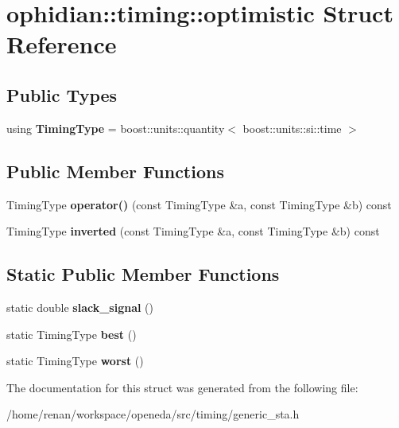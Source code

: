 \hypertarget{structophidian_1_1timing_1_1optimistic}{\section{ophidian\-:\-:timing\-:\-:optimistic Struct Reference}
\label{structophidian_1_1timing_1_1optimistic}
}
\subsection*{Public Types}
\begin{DoxyCompactItemize}
\item 
\hypertarget{structophidian_1_1timing_1_1optimistic_a20224456e3a1328f37724e5ad7d66f9c}{using {\bfseries Timing\-Type} = boost\-::units\-::quantity$<$ boost\-::units\-::si\-::time $>$}\label{structophidian_1_1timing_1_1optimistic_a20224456e3a1328f37724e5ad7d66f9c}

\end{DoxyCompactItemize}
\subsection*{Public Member Functions}
\begin{DoxyCompactItemize}
\item 
\hypertarget{structophidian_1_1timing_1_1optimistic_a37f4857a427814d852f1bfaa0261bafd}{Timing\-Type {\bfseries operator()} (const Timing\-Type \&a, const Timing\-Type \&b) const }\label{structophidian_1_1timing_1_1optimistic_a37f4857a427814d852f1bfaa0261bafd}

\item 
\hypertarget{structophidian_1_1timing_1_1optimistic_a70eaf65bacaa16ead50473c945afc56d}{Timing\-Type {\bfseries inverted} (const Timing\-Type \&a, const Timing\-Type \&b) const }\label{structophidian_1_1timing_1_1optimistic_a70eaf65bacaa16ead50473c945afc56d}

\end{DoxyCompactItemize}
\subsection*{Static Public Member Functions}
\begin{DoxyCompactItemize}
\item 
\hypertarget{structophidian_1_1timing_1_1optimistic_a5636c642a97902e5b87814e4a41f744d}{static double {\bfseries slack\-\_\-signal} ()}\label{structophidian_1_1timing_1_1optimistic_a5636c642a97902e5b87814e4a41f744d}

\item 
\hypertarget{structophidian_1_1timing_1_1optimistic_aacaa60fd86ccf0a20384cce8d6aeade3}{static Timing\-Type {\bfseries best} ()}\label{structophidian_1_1timing_1_1optimistic_aacaa60fd86ccf0a20384cce8d6aeade3}

\item 
\hypertarget{structophidian_1_1timing_1_1optimistic_ae8a2f5ec20a46a2dcc64d5792e968cb5}{static Timing\-Type {\bfseries worst} ()}\label{structophidian_1_1timing_1_1optimistic_ae8a2f5ec20a46a2dcc64d5792e968cb5}

\end{DoxyCompactItemize}


The documentation for this struct was generated from the following file\-:\begin{DoxyCompactItemize}
\item 
/home/renan/workspace/openeda/src/timing/generic\-\_\-sta.\-h\end{DoxyCompactItemize}
